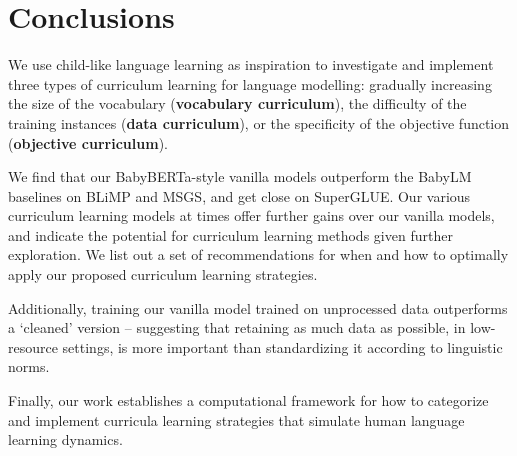\section{Conclusions}
We use child-like language learning as inspiration to investigate and implement three types of curriculum learning for language modelling: gradually increasing the size of the vocabulary (\textbf{vocabulary curriculum}), the difficulty of the training instances (\textbf{data curriculum}), or the specificity of the objective function (\textbf{objective curriculum}).

We find that our BabyBERTa-style vanilla models outperform the BabyLM baselines on BLiMP and MSGS, and get close on SuperGLUE. Our various curriculum learning models at times offer further gains over our vanilla models, and indicate the potential for curriculum learning methods given further exploration. We list out a set of recommendations for when and how to optimally apply our proposed curriculum learning strategies.

Additionally, training our vanilla model trained on unprocessed data outperforms a `cleaned' version -- suggesting that retaining as much data as possible, in low-resource settings, is more important than standardizing it according to linguistic norms.

Finally, our work establishes a computational framework for how to categorize and implement curricula learning strategies that simulate human language learning dynamics. 




